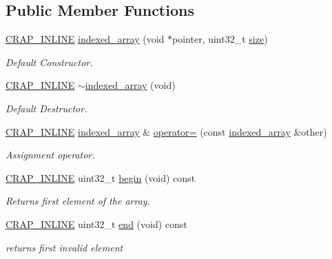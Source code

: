 \subsection*{Public Member Functions}
\begin{DoxyCompactItemize}
\item 
\hyperlink{config__x86_8h_a5a40526b8d842e7ff731509998bb0f1c}{C\+R\+A\+P\+\_\+\+I\+N\+L\+I\+N\+E} \hyperlink{classcrap_1_1indexed__array_aee95ccdd855e1c33573553d72bac4006}{indexed\+\_\+array} (void $\ast$pointer, uint32\+\_\+t \hyperlink{classcrap_1_1indexed__array_a1ac98bff03a0d2b8fafb5fde8102cf12}{size})
\begin{DoxyCompactList}\small\item\em Default Constructor. \end{DoxyCompactList}\item 
\hyperlink{config__x86_8h_a5a40526b8d842e7ff731509998bb0f1c}{C\+R\+A\+P\+\_\+\+I\+N\+L\+I\+N\+E} \hyperlink{classcrap_1_1indexed__array_a78715475a2dc120cc9f662308b25c0fc}{$\sim$indexed\+\_\+array} (void)
\begin{DoxyCompactList}\small\item\em Default Destructor. \end{DoxyCompactList}\item 
\hyperlink{config__x86_8h_a5a40526b8d842e7ff731509998bb0f1c}{C\+R\+A\+P\+\_\+\+I\+N\+L\+I\+N\+E} \hyperlink{classcrap_1_1indexed__array}{indexed\+\_\+array} \& \hyperlink{classcrap_1_1indexed__array_ad2d8756225ace11cc732be55def9fa70}{operator=} (const \hyperlink{classcrap_1_1indexed__array}{indexed\+\_\+array} \&other)
\begin{DoxyCompactList}\small\item\em Assignment operator. \end{DoxyCompactList}\item 
\hyperlink{config__x86_8h_a5a40526b8d842e7ff731509998bb0f1c}{C\+R\+A\+P\+\_\+\+I\+N\+L\+I\+N\+E} uint32\+\_\+t \hyperlink{classcrap_1_1indexed__array_a8f0c3a88be6e04750288918e2c170bce}{begin} (void) const 
\begin{DoxyCompactList}\small\item\em Returns first element of the array. \end{DoxyCompactList}\item 
\hyperlink{config__x86_8h_a5a40526b8d842e7ff731509998bb0f1c}{C\+R\+A\+P\+\_\+\+I\+N\+L\+I\+N\+E} uint32\+\_\+t \hyperlink{classcrap_1_1indexed__array_a8e7001ee5afd3c7c7949357de39207c8}{end} (void) const 
\begin{DoxyCompactList}\small\item\em returns first invalid element \end{DoxyCompactList}\item 

\end{DoxyCompactItemize}
